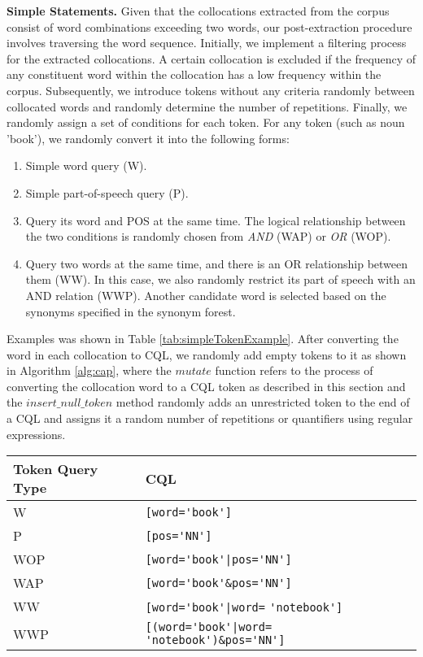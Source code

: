 \documentclass[11pt]{article}
\begin{document}
\begin{CJK*}{UTF8}{gbsn}
\textbf{Simple Statements. }
Given that the collocations extracted from the corpus consist of word combinations exceeding two words, our post-extraction procedure involves traversing the word sequence.
Initially, we implement a filtering process for the extracted collocations. A certain collocation is excluded if the frequency of any constituent word within the collocation has a low frequency within the corpus. Subsequently, we introduce tokens without any criteria randomly between collocated words and randomly determine the number of repetitions. Finally, we randomly assign a set of conditions for each token. For any token (such as noun 'book'), we randomly convert it into the following forms:
\begin{enumerate}
\item Simple word query (W).
\item Simple part-of-speech query (P).
\item Query its word and POS at the same time. The logical relationship between the two conditions is randomly chosen from \emph{AND} (WAP) or \emph{OR} (WOP).
\item Query two words at the same time, and there is an OR relationship between them (WW). In this case, we also randomly restrict its part of speech with an AND relation (WWP). Another candidate word is selected based on the synonyms specified in the synonym forest.

\end{enumerate}

Examples was shown in Table \ref{tab:simpleTokenExample}. After converting the word in each collocation to CQL, we randomly add empty tokens to it as shown in Algorithm \ref{alg:cap}, where the $mutate$ function refers to the process of converting the collocation word to a CQL token as described in this section and the $insert\_null\_token$ method randomly adds an unrestricted token to the end of a CQL and assigns it a random number of repetitions or quantifiers using regular expressions.

\begin{table}
    \centering
    \begin{tabular}{p{3em}p{15em}} 
    \hline
    \textbf{Token Query Type} & \textbf{CQL} \\
    \hline
    W& \verb|[word='book']| \\
    P& \verb|[pos='NN']|\\
    WOP& \verb^[word='book'|pos='NN']^\\
    WAP& \verb^[word='book'&pos='NN']^\\
    WW& \verb^[word='book'|word=^ \verb^'notebook']^\\
    WWP& \verb^[(word='book'|word=^ \verb^'notebook')&pos='NN']^\\


\end{tabular}
\end{table}
\end{CJK*}
\end{document}
